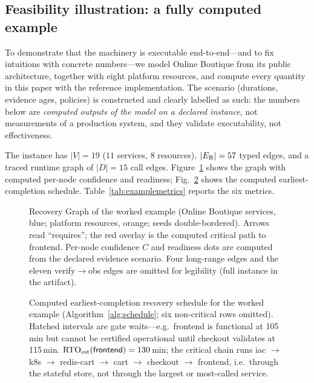 \subsection{Feasibility illustration: a fully computed example}
\label{sec:feasibility}

To demonstrate that the machinery is executable end-to-end---and to fix intuitions with concrete numbers---we model Online Boutique from its public architecture, together with eight platform resources, and compute every quantity in this paper with the reference implementation. The scenario (durations, evidence ages, policies) is constructed and clearly labelled as such: the numbers below are \emph{computed outputs of the model on a declared instance}, not measurements of a production system, and they validate executability, not effectiveness.

The instance has $|V| = 19$ ($11$ services, $8$ resources), $|E_{\mathrm{R}}| = 57$ typed edges, and a traced runtime graph of $|D| = 15$ call edges. Figure~\ref{fig:rgexample} shows the graph with computed per-node confidence and readiness; Fig.~\ref{fig:schedule} shows the computed earliest-completion schedule. Table~\ref{tab:examplemetrics} reports the six metrics.

\begin{figure}[t]
  \centering
  \resizebox{\textwidth}{!}{}
  \caption{Recovery Graph of the worked example (Online Boutique services, blue; platform resources, orange; seeds double-bordered). Arrows read ``requires''; the red overlay is the computed critical path to \textsf{frontend}. Per-node confidence $C$ and readiness dots are computed from the declared evidence scenario. Four long-range edges and the eleven \textsf{verify}$\to$\textsf{obs} edges are omitted for legibility (full instance in the artifact).}
  \label{fig:rgexample}
\end{figure}

\begin{figure}[t]
  \centering
  
  \caption{Computed earliest-completion recovery schedule for the worked example (Algorithm~\ref{alg:schedule}; six non-critical rows omitted). Hatched intervals are gate waits---e.g.\ \textsf{frontend} is functional at 105\,min but cannot be certified operational until \textsf{checkout} validates at 115\,min. $\mathrm{RTO}_{\mathrm{est}}(\textsf{frontend}) = 130$\,min; the critical chain runs \textsf{iac} $\to$ \textsf{k8s} $\to$ \textsf{redis-cart} $\to$ \textsf{cart} $\to$ \textsf{checkout} $\to$ \textsf{frontend}, i.e.\ through the stateful store, not through the largest or most-called service.}
  \label{fig:schedule}
\end{figure}

